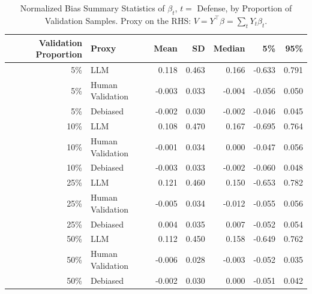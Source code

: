 \begin{table}

\caption{Normalized Bias Summary Statistics of $\beta_{t}$, $t=$ Defense, by Proportion of Validation Samples.
      Proxy on the RHS: $V = Y^\top \beta = \sum_{t} Y_t \beta_t$.}
\centering
\begin{tabular}[t]{rlrrrrr}
\toprule
Validation Proportion & Proxy & Mean & SD & Median & 5\% & 95\%\\
\midrule
5\% & LLM & 0.118 & 0.463 & 0.166 & -0.633 & 0.791\\
5\% & Human Validation & -0.003 & 0.033 & -0.004 & -0.056 & 0.050\\
5\% & Debiased & -0.002 & 0.030 & -0.002 & -0.046 & 0.045\\
10\% & LLM & 0.108 & 0.470 & 0.167 & -0.695 & 0.764\\
10\% & Human Validation & -0.001 & 0.034 & 0.000 & -0.047 & 0.056\\
10\% & Debiased & -0.003 & 0.033 & -0.002 & -0.060 & 0.048\\
25\% & LLM & 0.121 & 0.460 & 0.150 & -0.653 & 0.782\\
25\% & Human Validation & -0.005 & 0.034 & -0.012 & -0.055 & 0.056\\
25\% & Debiased & 0.004 & 0.035 & 0.007 & -0.052 & 0.054\\
50\% & LLM & 0.112 & 0.450 & 0.158 & -0.649 & 0.762\\
50\% & Human Validation & -0.006 & 0.028 & -0.003 & -0.052 & 0.035\\
50\% & Debiased & -0.002 & 0.030 & 0.000 & -0.051 & 0.042\\
\bottomrule
\end{tabular}
\end{table}
